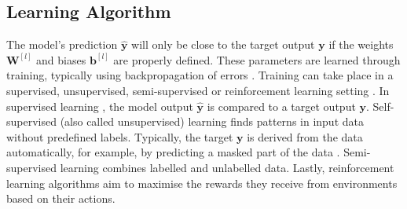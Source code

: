 \subsection{Learning Algorithm}
The model's prediction $\boldsymbol{\hat{y}}$ will only be close to the target output $\boldsymbol{y}$ if the weights $\boldsymbol{W}^{[l]}$ and biases $\boldsymbol{b}^{[l]}$ are properly defined.
These parameters are learned through training, typically using backpropagation of errors .
Training can take place in a supervised, unsupervised, semi-supervised or reinforcement learning setting . In supervised learning , the model output $\boldsymbol{\hat{y}}$ is compared to a target output $\boldsymbol{y}$. Self-supervised (also called unsupervised) learning \cite{liu_self-supervised_2021} finds patterns in input data without predefined labels. Typically, the target $\boldsymbol{y}$ is derived from the data automatically, for example, by predicting a masked part of the data \cite{radford_improving_2018}. Semi-supervised learning \cite{van_engelen_survey_2020} combines labelled and unlabelled data. Lastly, reinforcement learning algorithms \cite{arulkumaran_deep_2017} aim to maximise the rewards they receive from environments based on their actions.

